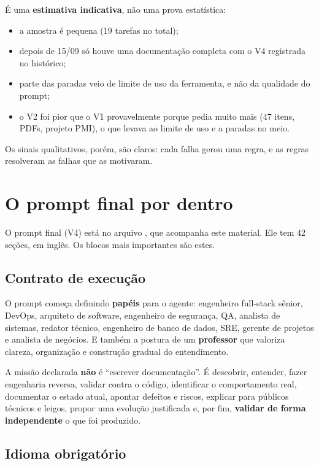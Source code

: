 \begin{atencao}
É uma \textbf{estimativa indicativa}, não uma prova estatística:
\begin{itemize}
  \item a amostra é pequena (19 tarefas no total);
  \item depois de 15/09 só houve uma documentação completa com o V4 registrada no histórico;
  \item parte das paradas veio de limite de uso da ferramenta, e não da qualidade do prompt;
  \item o V2 foi pior que o V1 provavelmente porque pedia muito mais (47 itens, PDFs, projeto PMI), o que levava ao limite de uso e a paradas no meio.
\end{itemize}
Os sinais qualitativos, porém, são claros: cada falha gerou uma regra, e as regras resolveram as falhas que as motivaram.
\end{atencao}

\section{O prompt final por dentro}

O prompt final (V4) está no arquivo , que acompanha este material. Ele tem 42 seções, em inglês. Os blocos mais importantes são estes.

\subsection{Contrato de execução}

O prompt começa definindo \textbf{papéis} para o agente: engenheiro full-stack sênior, DevOps, arquiteto de software, engenheiro de segurança, QA, analista de sistemas, redator técnico, engenheiro de banco de dados, SRE, gerente de projetos e analista de negócios. E também a postura de um \textbf{professor} que valoriza clareza, organização e construção gradual do entendimento.

A missão declarada \textbf{não} é \enquote{escrever documentação}. É descobrir, entender, fazer engenharia reversa, validar contra o código, identificar o comportamento real, documentar o estado atual, apontar defeitos e riscos, explicar para públicos técnicos e leigos, propor uma evolução justificada e, por fim, \textbf{validar de forma independente} o que foi produzido.

\subsection{Idioma obrigatório}

